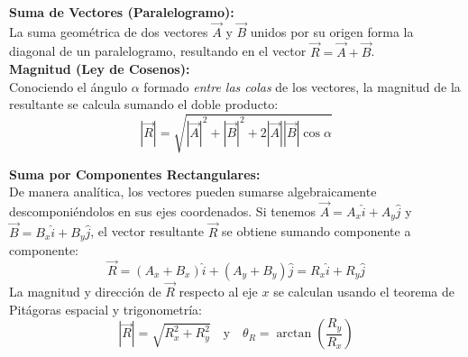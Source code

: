 \documentclass[11pt,letterpaper]{article}
\begin{document}
\vspace{0.4cm}
\begin{minipage}{0.5\textwidth}
\textbf{Suma de Vectores (Paralelogramo):} \\
La suma geométrica de dos vectores $\vec{A}$ y $\vec{B}$ unidos por su origen forma la diagonal de un paralelogramo, resultando en el vector $\vec{R} = \vec{A} + \vec{B}$. \\

\textbf{Magnitud (Ley de Cosenos):} \\
Conociendo el ángulo $\alpha$ formado \textit{entre las colas} de los vectores, la magnitud de la resultante se calcula sumando el doble producto:
$$ |\vec{R}| = \sqrt{|\vec{A}|^2 + |\vec{B}|^2 + 2|\vec{A}||\vec{B}|\cos\alpha} $$
\end{minipage}%
\begin{minipage}{0.5\textwidth}
\begin{center}
\end{center}
\end{minipage}

\vspace{0.4cm}
\begin{minipage}{\textwidth}
\textbf{Suma por Componentes Rectangulares:} \\
De manera analítica, los vectores pueden sumarse algebraicamente descomponiéndolos en sus ejes coordenados. Si tenemos $\vec{A} = A_x\hat{i} + A_y\hat{j}$ y $\vec{B} = B_x\hat{i} + B_y\hat{j}$, el vector resultante $\vec{R}$ se obtiene sumando componente a componente:
$$ \vec{R} = (A_x + B_x)\hat{i} + (A_y + B_y)\hat{j} = R_x\hat{i} + R_y\hat{j} $$
La magnitud y dirección de $\vec{R}$ respecto al eje $x$ se calculan usando el teorema de Pitágoras espacial y trigonometría:
$$ |\vec{R}| = \sqrt{R_x^2 + R_y^2} \quad \text{y} \quad \theta_R = \arctan\left(\frac{R_y}{R_x}\right) $$
\end{minipage}
\end{document}
